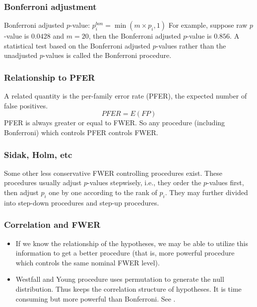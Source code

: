 \begin{frame}
  \frametitle{Bonferroni adjustment} Bonferroni adjusted $p$-value:
  $p^{bon}_i = \min (m \times p_i, 1)$ For example, suppose raw
  $p$-value is $0.0428$ and $m=20$, then the Bonferroni adjusted
  $p$-value is $0.856$. A statistical test based on the Bonferroni
  adjusted $p$-values rather than the unadjusted $p$-values is called
  the Bonferroni procedure.
\end{frame}

\begin{frame}
  \frametitle{Relationship to PFER} A related quantity is the
  per-family error rate (PFER), the expected number of false
  positives.
  \begin{equation}
    \label{eq:pfer}
    PFER = E(FP)
  \end{equation}
  PFER is always greater or equal to FWER. So any procedure (including
  Bonferroni) which controls PFER controls FWER.  
\end{frame}

\begin{frame}
  \frametitle{Sidak, Holm, etc} Some other less conservative FWER controlling
  procedures exist. These procedures usually adjust $p$-values
  stepwisely, i.e., they order the $p$-values first, then adjust $p_i$
  one by one according to the rank of $p_i$. They may further divided
  into step-down procedures and step-up procedures.
\end{frame}

\begin{frame}
  \frametitle{Correlation and FWER} 
  \begin{itemize}
  \item If we know the relationship of the hypotheses, we may be able
    to utilize this information to get a better procedure (that is,
    more powerful procedure which controls the same nominal FWER
    level).
  \item Westfall and Young procedure uses permutation to generate the
    null distribution. Thus keeps the correlation structure of
    hypotheses. It is time consuming but more powerful than
    Bonferroni.  See
    \cite{Westfall1993Resampling-BasedMultipleTesting}.
  \end{itemize}
\end{frame}


